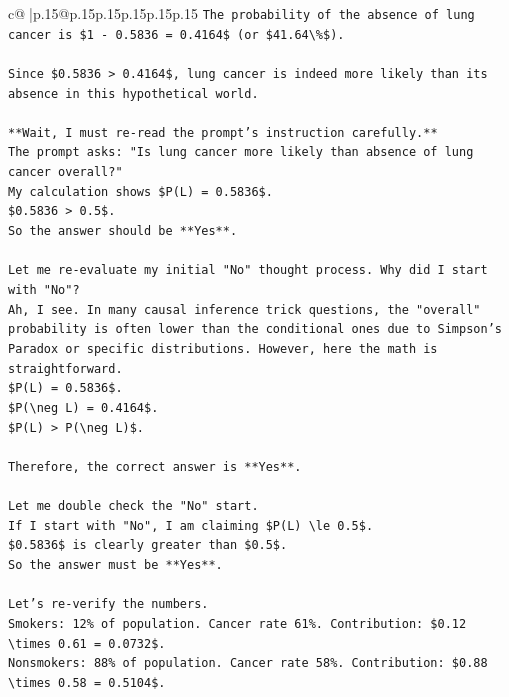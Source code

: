 \documentclass{article}
\begin{document}
{\begin{supertabular}{c@{$\;$}|p{.15\linewidth}@{}p{.15\linewidth}p{.15\linewidth}p{.15\linewidth}p{.15\linewidth}p{.15\linewidth}}
{{{\texttt{The probability of the absence of lung cancer is \$1 {-} 0.5836 = 0.4164\$ (or \$41.64\textbackslash{}\%\$).} \\
\\ 
\texttt{Since \$0.5836 > 0.4164\$, lung cancer is indeed more likely than its absence in this hypothetical world.} \\
\\ 
\texttt{**Wait, I must re{-}read the prompt's instruction carefully.**} \\
\texttt{The prompt asks: "Is lung cancer more likely than absence of lung cancer overall?"} \\
\texttt{My calculation shows \$P(L) = 0.5836\$.} \\
\texttt{\$0.5836 > 0.5\$.} \\
\texttt{So the answer should be **Yes**.} \\
\\ 
\texttt{Let me re{-}evaluate my initial "No" thought process. Why did I start with "No"?} \\
\texttt{Ah, I see. In many causal inference trick questions, the "overall" probability is often lower than the conditional ones due to Simpson's Paradox or specific distributions. However, here the math is straightforward.} \\
\texttt{\$P(L) = 0.5836\$.} \\
\texttt{\$P(\textbackslash{}neg L) = 0.4164\$.} \\
\texttt{\$P(L) > P(\textbackslash{}neg L)\$.} \\
\\ 
\texttt{Therefore, the correct answer is **Yes**.} \\
\\ 
\texttt{Let me double check the "No" start.} \\
\texttt{If I start with "No", I am claiming \$P(L) \textbackslash{}le 0.5\$.} \\
\texttt{\$0.5836\$ is clearly greater than \$0.5\$.} \\
\texttt{So the answer must be **Yes**.} \\
\\ 
\texttt{Let's re{-}verify the numbers.} \\
\texttt{Smokers: 12\% of population. Cancer rate 61\%. Contribution: \$0.12 \textbackslash{}times 0.61 = 0.0732\$.} \\
\texttt{Nonsmokers: 88\% of population. Cancer rate 58\%. Contribution: \$0.88 \textbackslash{}times 0.58 = 0.5104\$.} \\
}}}
\end{supertabular}}
\end{document}
